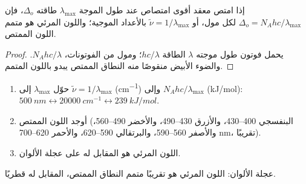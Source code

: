 \begin{proposition}\label{prop:b2:ligand-field:colour}
إذا امتص معقد أقوى امتصاص عند طول الموجة $\lambda_{\max}$ 
طاقته $\Delta_o$، فإن $\Delta_o = N_Ahc/\lambda_{\max}$ لكل مول، أو $\tilde\nu = 1/\lambda_{\max}$
بالأعداد الموجية؛ واللون المرئي هو متمم اللون الممتص.
\end{proposition}

\begin{proof}
يحمل فوتون طول موجته $\lambda$ الطاقة $hc/\lambda$؛ ومول من الفوتونات، $N_Ahc/\lambda$. والضوء
الأبيض منقوصًا منه النطاق الممتص يبدو باللون المتمم.
\end{proof}

\begin{method}\label{met:b2:ligand-field:colour}
\begin{enumerate}
  \item حوّل $\lambda_{\max}$ إلى $\tilde\nu = 1/\lambda_{\max}$ (\unit{cm^{-1}}) وإلى
        $N_Ahc/\lambda_{\max}$ (\unit{kJ/mol}): $\qty{500}{nm} \leftrightarrow \qty{20000}{cm^{-1}}
        \leftrightarrow \qty{239}{kJ/mol}$.
  \item أوجد اللون الممتص (البنفسجي 400--430، والأزرق 430--490، والأخضر 490--560، والأصفر
        560--590، والبرتقالي 590--620، والأحمر 620--700 nm، تقريبًا).
  \item اللون المرئي هو المقابل له على عجلة الألوان.
\end{enumerate}
\end{method}

\begin{omfigure}

{\small عجلة الألوان: اللون المرئي هو تقريبًا متمم النطاق الممتص، المقابل له
قطريًا.}
\end{omfigure}

